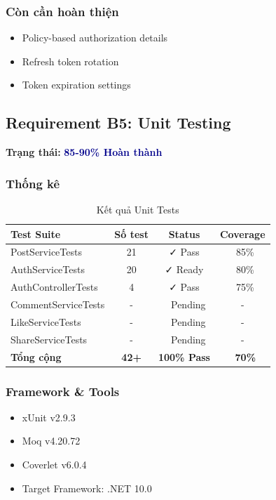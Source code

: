 \documentclass[12pt,a4paper]{report}
\begin{document}
\subsubsection{Còn cần hoàn thiện}
\begin{itemize}
    \item Policy-based authorization details
    \item Refresh token rotation
    \item Token expiration settings
\end{itemize}

\newpage

\subsection{Requirement B5: Unit Testing}
\textbf{Trạng thái: } \textcolor{darkblue}{\textbf{85-90\% Hoàn thành}}

\subsubsection{Thống kê}
\begin{table}[h]
    \centering
    \begin{tabular}{|l|c|c|c|}
        \hline
        \rowcolor{lightblue}
        \textbf{Test Suite} & \textbf{Số test} & \textbf{Status} & \textbf{Coverage} \\
        \hline
        PostServiceTests & 21 & \cellcolor{lightgreen}✓ Pass & ~85\% \\
        AuthServiceTests & 20 & \cellcolor{lightgreen}✓ Ready & ~80\% \\
        AuthControllerTests & 4 & \cellcolor{lightgreen}✓ Pass & ~75\% \\
        CommentServiceTests & - & \cellcolor{lightblue}~ Pending & - \\
        LikeServiceTests & - & \cellcolor{lightblue}~ Pending & - \\
        ShareServiceTests & - & \cellcolor{lightblue}~ Pending & - \\
        \hline
        \textbf{Tổng cộng} & \textbf{42+} & \textbf{100\% Pass} & \textbf{~70\%} \\
        \hline
    \end{tabular}
    \caption{Kết quả Unit Tests}
\end{table}

\subsubsection{Framework \& Tools}
\begin{itemize}
    \item xUnit v2.9.3
    \item Moq v4.20.72
    \item Coverlet v6.0.4
    \item Target Framework: .NET 10.0
\end{itemize}
\end{document}

